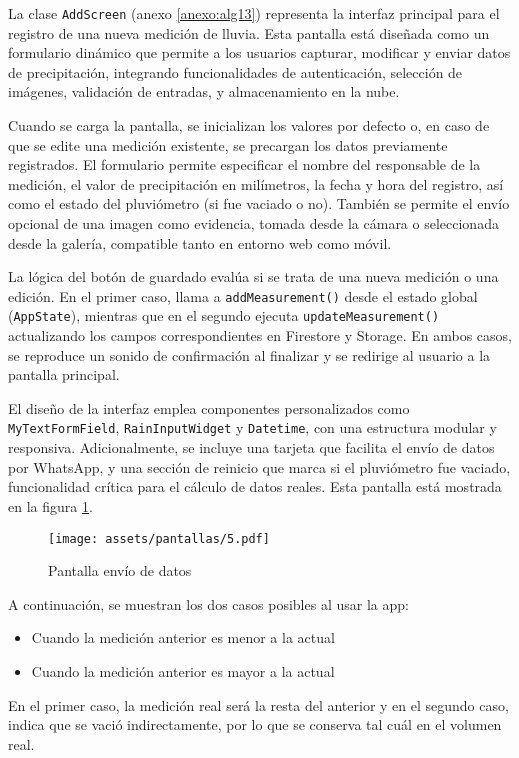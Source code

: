 La clase \texttt{AddScreen} (anexo \ref{anexo:alg13}) representa la interfaz principal para el registro de una nueva medición de lluvia. Esta pantalla está diseñada como un formulario dinámico que permite a los usuarios capturar, modificar y enviar datos de precipitación, integrando funcionalidades de autenticación, selección de imágenes, validación de entradas, y almacenamiento en la nube.

Cuando se carga la pantalla, se inicializan los valores por defecto o, en caso de que se edite una medición existente, se precargan los datos previamente registrados. El formulario permite especificar el nombre del responsable de la medición, el valor de precipitación en milímetros, la fecha y hora del registro, así como el estado del pluviómetro (si fue vaciado o no). También se permite el envío opcional de una imagen como evidencia, tomada desde la cámara o seleccionada desde la galería, compatible tanto en entorno web como móvil.

La lógica del botón de guardado evalúa si se trata de una nueva medición o una edición. En el primer caso, llama a \texttt{addMeasurement()} desde el estado global (\texttt{AppState}), mientras que en el segundo ejecuta \texttt{updateMeasurement()} actualizando los campos correspondientes en Firestore y Storage. En ambos casos, se reproduce un sonido de confirmación al finalizar y se redirige al usuario a la pantalla principal.

El diseño de la interfaz emplea componentes personalizados como \texttt{MyTextFormField}, \texttt{RainInputWidget} y \texttt{Datetime}, con una estructura modular y responsiva. Adicionalmente, se incluye una tarjeta que facilita el envío de datos por WhatsApp, y una sección de reinicio que marca si el pluviómetro fue vaciado, funcionalidad crítica para el cálculo de datos reales. Esta pantalla está mostrada en la figura \ref{pantallas5}.

\begin{figure}[h!]
\centering
  \texttt{[image: assets/pantallas/5.pdf]}
  \caption{Pantalla envío de datos}
  \label{pantallas5}
\end{figure}

A continuación, se muestran los dos casos posibles al usar la app:
\begin{itemize}
  \item Cuando la medición anterior es menor a la actual
  \item Cuando la medición anterior es mayor a la actual
\end{itemize}
En el primer caso, la medición real será la resta del anterior y en el segundo caso, indica que se vació indirectamente, por lo que se conserva tal cuál en el volumen real.


